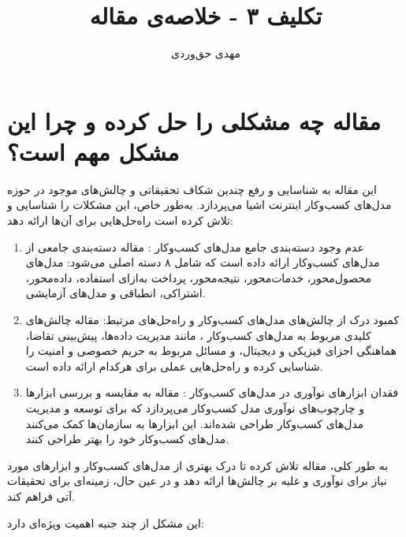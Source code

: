 \documentclass[10pt, twocolumn]{article}
\title{تکلیف ۳ - خلاصه‌ی مقاله}
\author{مهدی حق‌وردی}
\date{}
\begin{document}
\maketitle
\tableofcontents

\section{مقاله چه مشکلی را حل کرده و چرا این مشکل مهم است؟}
این مقاله به شناسایی و رفع چندین شکاف تحقیقاتی و چالش‌های موجود در حوزه مدل‌های کسب‌وکار اینترنت اشیا  می‌پردازد. به‌طور خاص، این مشکلات را شناسایی و تلاش کرده است راه‌حل‌هایی برای آن‌ها ارائه دهد:  

\begin{enumerate}
\item
 عدم وجود دسته‌بندی جامع مدل‌های کسب‌وکار :  
   مقاله دسته‌بندی جامعی از مدل‌های کسب‌وکار  ارائه داده است که شامل ۸ دسته اصلی می‌شود: مدل‌های محصول‌محور، خدمات‌محور، نتیجه‌محور، پرداخت به‌ازای استفاده، داده‌محور، اشتراکی، انطباقی و مدل‌های آزمایشی.  

\item 
کمبود درک از چالش‌های مدل‌های کسب‌وکار  و راه‌حل‌های مرتبط:  
   مقاله چالش‌های کلیدی مربوط به مدل‌های کسب‌وکار ، مانند مدیریت داده‌ها، پیش‌بینی تقاضا، هماهنگی اجزای فیزیکی و دیجیتال، و مسائل مربوط به حریم خصوصی و امنیت را شناسایی کرده و راه‌حل‌هایی عملی برای هرکدام ارائه داده است.  

\item 
فقدان ابزارهای نوآوری در مدل‌های کسب‌وکار :  
   مقاله به مقایسه و بررسی ابزارها و چارچوب‌های نوآوری مدل کسب‌وکار  می‌پردازد که برای توسعه و مدیریت مدل‌های کسب‌وکار  طراحی شده‌اند. این ابزارها به سازمان‌ها کمک می‌کنند مدل‌های کسب‌وکار  خود را بهتر طراحی کنند.  

\end{enumerate}
به طور کلی، مقاله تلاش کرده تا درک بهتری از مدل‌های کسب‌وکار  و ابزارهای مورد نیاز برای نوآوری و غلبه بر چالش‌ها ارائه دهد و در عین حال، زمینه‌ای برای تحقیقات آتی فراهم کند.

این مشکل از چند جنبه اهمیت ویژه‌ای دارد:  
\end{document}
